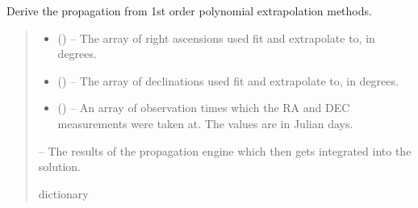\documentclass[letterpaper,11pt,english]{sphinxmanual}
\begin{document}

\begin{savenotes}\begin{fulllineitems}
\label{\detokenize{code/opihiexarata.propagate.solution:opihiexarata.propagate.solution._vehicle_linear_propagation}}
\pysigstartsignatures
{}
\pysigstopsignatures
\sphinxAtStartPar
Derive the propagation from 1st order polynomial extrapolation methods.
\begin{quote}\begin{description}
\begin{itemize}
\item {} 
\sphinxAtStartPar
{} () – The array of right ascensions used fit and extrapolate to,
in degrees.

\item {} 
\sphinxAtStartPar
{} () – The array of declinations used fit and extrapolate to, in degrees.

\item {} 
\sphinxAtStartPar
{} () – An array of observation times which the RA and DEC measurements
were taken at. The values are in Julian days.

\end{itemize}

\sphinxAtStartPar
{} – The results of the propagation engine which then gets integrated into
the solution.

\sphinxAtStartPar
dictionary

\end{description}\end{quote}

\end{fulllineitems}\end{savenotes}
\end{document}
